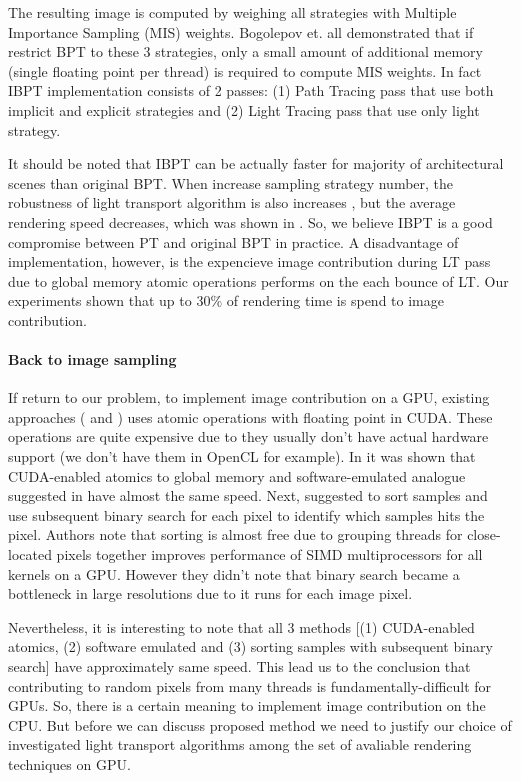 \documentclass[twoside,twocolumn,10pt]{article}
\begin{document}
The resulting image is computed by weighing all strategies with Multiple Importance Sampling (MIS) weights. Bogolepov et. all demonstrated that if restrict BPT to these 3 strategies, only a small amount of additional memory (single floating point per thread) is required to compute MIS weights. In fact IBPT implementation consists of 2 passes: (1) Path Tracing pass that use both implicit and explicit strategies and (2) Light Tracing pass that use only light strategy.  

It should be noted that IBPT can be actually faster for majority of architectural scenes than original BPT. When increase sampling strategy number, the robustness of light transport algorithm is also increases \cite{Veach98}, but the average rendering speed decreases, which was shown in \cite{PCBPT}. So, we believe IBPT is a good compromise between PT and original BPT in practice. A disadvantage of \cite{Bogolepov13} implementation, however, is the expencieve image contribution during LT pass due to global memory atomic operations performs on the each bounce of LT. Our experiments shown that up to 30\% of rendering time is spend to image contribution. 

\paragraph{Back to image sampling}
If return to our problem, to implement image contribution on a GPU, existing approaches (\cite{Antwerpen11} and \cite{Bogolepov13}) uses atomic operations with floating point in CUDA. These operations are quite expensive due to they usually don't have actual hardware support (we don't have them in OpenCL for example). In \cite{MemCompactMLT} it was shown that CUDA-enabled atomics to global memory and software-emulated analogue suggested in \cite{atomicsCL} have almost the same speed. Next, \cite{MemCompactMLT} suggested to sort samples and use subsequent binary search for each pixel to identify which samples hits the pixel. Authors note that sorting is almost free due to grouping threads for close-located pixels together improves performance of SIMD multiprocessors for all kernels on a GPU. However they didn't note that binary search became a bottleneck in large resolutions due to it runs for each image pixel. 

Nevertheless, it is interesting to note that all 3 methods [(1) CUDA-enabled atomics, (2) software emulated and (3) sorting samples with subsequent binary search] have approximately same speed. This lead us to the conclusion that contributing to random pixels from many threads is fundamentally-difficult for GPUs. So, there is a certain meaning to implement image contribution on the CPU. But before we can discuss proposed method we need to justify our choice of investigated light transport algorithms among the set of avaliable rendering techniques on GPU. 
\end{document}
